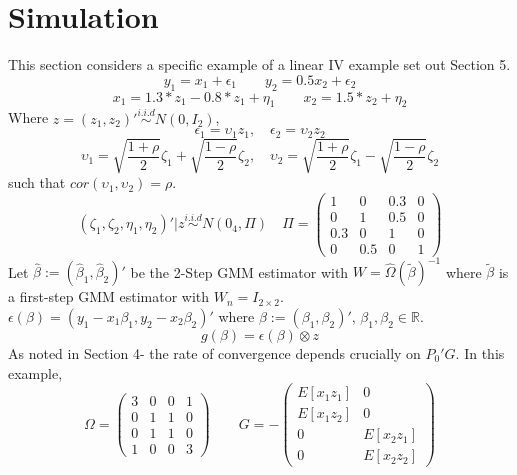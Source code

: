 \documentclass[11pt, fleqn]{article}
\begin{document}
\section{Simulation}
 This section considers a specific example of a linear IV example set out Section 5.
\begin{equation*} y_{1}=  x_{1} + \epsilon_{1} \qquad y_{2}=0.5 x_2+ \epsilon_{2} \end{equation*}
\begin{equation*} x_1 = 1.3*z_1-0.8*z_1 +\eta_1 \qquad  x_2 =1.5*z_2 +\eta_2 \end{equation*}
Where $z=(z_1,z_2)'\overset{i.i.d}{\sim} N(0,I_2)$,
\begin{equation*}\epsilon_1=\upsilon_1z_1, \quad \epsilon_2=\upsilon_2 z_2\end{equation*}
\begin{equation*} \upsilon_{1}= \sqrt{\frac{1+\rho}{2}} \zeta_1 + \sqrt{\frac{1-\rho}{2}} \zeta_2, \quad\upsilon_2= \sqrt{\frac{1+\rho}{2}} \zeta_1 - \sqrt{\frac{1-\rho}{2}} \zeta_2\end{equation*}
such that $cor(\upsilon_1,\upsilon_2)=\rho$.
\begin{equation*} (\zeta_1,\zeta_2,\eta_1, \eta_2)'|z \overset{i.i.d}{\sim} N(0_4, \Pi)\quad \Pi=\left(\begin{array}{cccc}  1 & 0 & 0.3 & 0 \\  0 & 1 & 0.5 & 0 \\ 0.3 & 0 &1 & 0 \\ 0 & 0.5 &0 & 1  \end{array} \right)\end{equation*}
Let $\hat{\beta}:=(\hat{\beta}_1,\hat{\beta}_2)'$ be the 2-Step GMM estimator with $W=\hat{\Omega}(\tilde{\beta})^{-1}$ where $\tilde{\beta}$ is a first-step GMM estimator with $W_n=I_{2\times2 }$.\\ $\epsilon(\beta)=(y_1-x_1\beta_1,y_2-x_2\beta_2)'$ where $\beta:=(\beta_1,\beta_2)'$, $\beta_1,\beta_2 \in \mathbb{R}$.
\begin{equation} g(\beta)= \epsilon(\beta)\otimes z \end{equation}
As noted in Section 4- the rate of convergence depends crucially on $P_0'G$.
In this example,
\begin{equation} \Omega=\left(\begin{array}{cccc} 3 &0&0&1 \\ 0&1&1&0\\0&1&1&0\\1&0&0&3 \end{array}\right) \qquad G=-\left(\begin{array}{cc} E[x_1z_1] & 0\\  E[x_1 z_2] & 0\\ 0 & E[x_2z_1] \\ 0 & E[x_2z_2]\end{array} \right) \end{equation}
\end{document}
